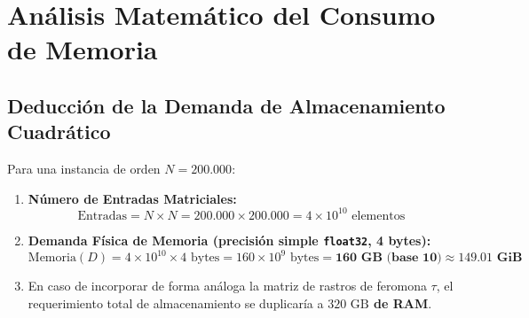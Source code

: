 \documentclass[11pt,a4paper]{article}
\begin{document}
\section{Análisis Matemático del Consumo de Memoria}

\subsection{Deducción de la Demanda de Almacenamiento Cuadrático}
Para una instancia de orden $N = 200.000$:
\begin{enumerate}
    \item \textbf{Número de Entradas Matriciales:}
    \begin{equation}
        \text{Entradas} = N \times N = 200.000 \times 200.000 = 4 \times 10^{10} \text{ elementos}
    \end{equation}
    \item \textbf{Demanda Física de Memoria (precisión simple \texttt{float32}, 4 bytes):}
    \begin{equation}
        \text{Memoria}(D) = 4 \times 10^{10} \times 4\text{ bytes} = 160 \times 10^9\text{ bytes} = \mathbf{160\text{ GB (base 10)}} \approx \mathbf{149.01\text{ GiB}}
    \end{equation}
    \item En caso de incorporar de forma análoga la matriz de rastros de feromona $\tau$, el requerimiento total de almacenamiento se duplicaría a \textbf{$320\text{ GB}$ de RAM}.
\end{enumerate}
\end{document}
